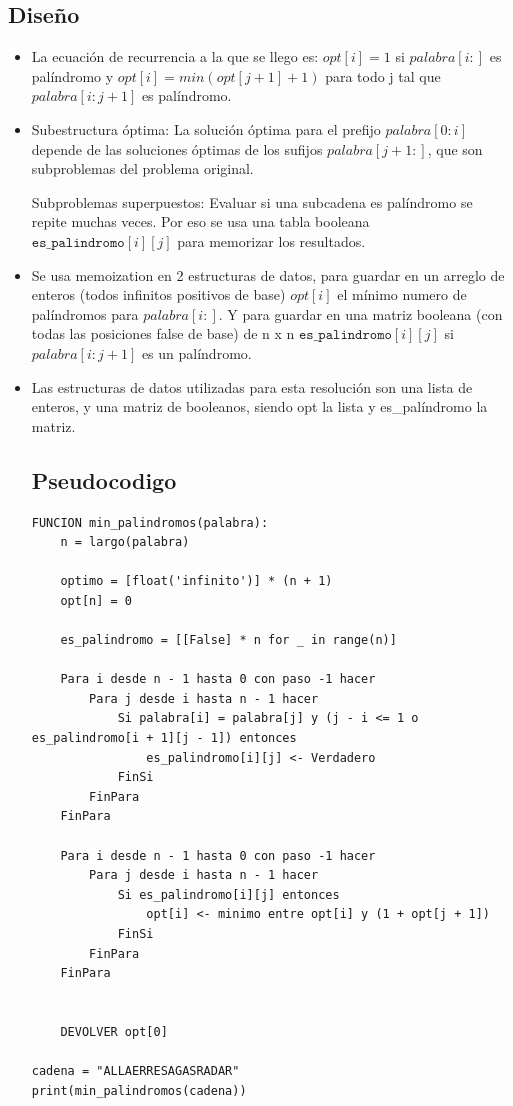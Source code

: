 \documentclass[a4paper, 12pt]{article}
\begin{document}
\subsection{Diseño}
\begin{itemize}
\item La ecuación de recurrencia a la que se llego es: \(opt[i] = 1\) si \(palabra[i:]\) es palíndromo y \(opt[i] = min(opt[j+1] + 1)\) para todo j tal que \(palabra[i:j+1]\) es palíndromo.

\item Subestructura óptima: La solución óptima para el prefijo \(palabra[0:i]\) depende de las soluciones óptimas de los sufijos \(palabra[j+1:]\), que son subproblemas del problema original.

Subproblemas superpuestos: Evaluar si una subcadena es palíndromo se repite muchas veces. Por eso se usa una tabla booleana \(\texttt{es\_palindromo}[i][j]\) para memorizar los resultados.

\item Se usa memoization en 2 estructuras de datos, para guardar en un arreglo de enteros (todos infinitos positivos de base) \(opt[i]\) el mínimo numero de palíndromos para \(palabra[i:]\). Y para guardar en una matriz booleana (con todas las posiciones false de base) de n x n \(\texttt{es\_palindromo}[i][j]\) si \(palabra[i:j+1]\) es un palíndromo.

\item Las estructuras de datos utilizadas para esta resolución son una lista de enteros, y una matriz de booleanos, siendo opt la lista y es\_palíndromo la matriz.

\newpage
\subsection{Pseudocodigo}
	\begin{lstlisting}[frame=single]
FUNCION min_palindromos(palabra):
    n = largo(palabra)
    
    optimo = [float('infinito')] * (n + 1)
    opt[n] = 0

    es_palindromo = [[False] * n for _ in range(n)]

    Para i desde n - 1 hasta 0 con paso -1 hacer
        Para j desde i hasta n - 1 hacer
            Si palabra[i] = palabra[j] y (j - i <= 1 o es_palindromo[i + 1][j - 1]) entonces
                es_palindromo[i][j] <- Verdadero
            FinSi
        FinPara
    FinPara

    Para i desde n - 1 hasta 0 con paso -1 hacer
        Para j desde i hasta n - 1 hacer
            Si es_palindromo[i][j] entonces
                opt[i] <- minimo entre opt[i] y (1 + opt[j + 1])
            FinSi
        FinPara
    FinPara


    DEVOLVER opt[0]

cadena = "ALLAERRESAGASRADAR"
print(min_palindromos(cadena))
	\end{lstlisting}

\end{itemize}
\end{document}
